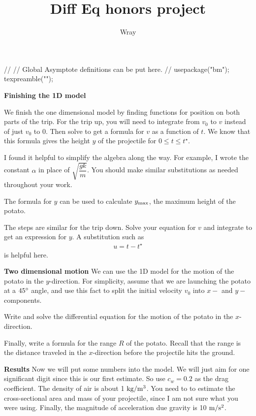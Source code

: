 \documentclass[addpoints, 12pt]{exam}
\title{Diff Eq honors project}
\author{Wray}
\begin{document}
\begin{asydef}
//
// Global Asymptote definitions can be put here.
//
usepackage("bm");
texpreamble("\def\V#1{\bm{#1}}");
\end{asydef}


\bigskip

\bigskip

\textbf{Finishing the 1D model} \bigskip

We finish the one dimensional model by finding functions for position on both parts of the trip.  For the trip up, you will need to integrate from $v_0$ to $v$ instead of just $v_0$ to $0$.  Then solve to get a formula for $v$ as a function of $t$.  We know that this formula gives the height $y$ of the projectile for $0 \le t \le t^{\star}$.

\bigskip
I found it helpful to simplify the algebra along the way.  For example, I wrote the constant $\alpha$
in place of $\sqrt{\dfrac{gk}{m}}$.  You should make similar substitutions as needed throughout your work.

\bigskip
The formula for $y$ can be used to calculate $y_{\textnormal{max}}$, the maximum height of the potato.  

\bigskip
The steps are similar for the trip down.  Solve your equation for $v$ and integrate to get an expression for $y$.  A substitution such as
\begin{align*}
	u = t - t^{\star}
\end{align*}
is helpful here.  

\bigskip

\textbf{Two dimensional motion} \bigskip
\newline
We can use the 1D model for the motion of the potato in the $y$-direction.  For simplicity, assume that we are launching the potato at a $45 \degree$ angle, and use this fact to split the initial velocity $v_0$ into $x-$ and $y-$components.

\bigskip
Write and solve the differential equation for the motion of the potato in the $x$-direction.

\bigskip
Finally, write a formula for the range $R$ of the potato.  Recall that the range is the distance traveled in the $x$-direction before the projectile hits the ground.

\bigskip
\textbf{Results} 
\bigskip
\newline
Now we will put some numbers into the model.  We will just aim for one significant digit since this is our first estimate.  So use $c_w = 0.2$ as the drag coefficient.  The density of air is about 1 $\textnormal{kg}/\textnormal{m}^3$.  You need to to estimate the cross-sectional area and mass of your projectile, since I am not sure what you were using.  Finally, the magnitude of acceleration due gravity is  10 $\textnormal{m}/\textnormal{s}^2$.
\end{document}
